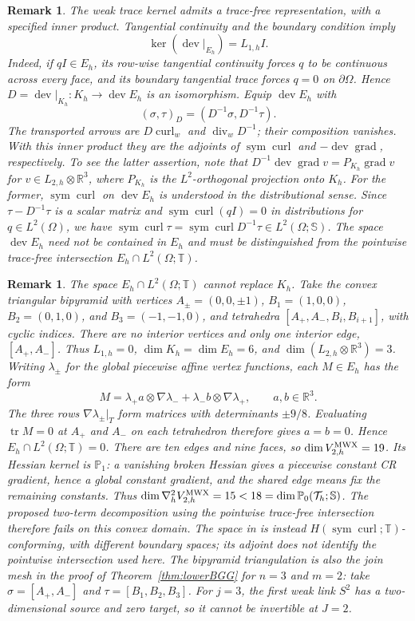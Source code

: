 \documentclass[10pt]{amsart}
\numberwithin{equation}{section}
\newtheorem{remark}[theorem]{Remark}
\newcommand{\curl}{\operatorname{curl}}
\renewcommand{\div}{\operatorname{div}}
\newcommand{\grad}{\operatorname{grad}}
\newcommand{\tr}{\operatorname{tr}}
\newcommand{\dev}{\operatorname{dev}}
\newcommand{\sym}{\operatorname{sym}}
\begin{document}
\begin{remark}\label{rem:weakTraceRepresentation}\rm
The weak trace kernel admits a trace-free representation, with a specified
inner product. Tangential continuity and the boundary condition imply
\[
\ker(\dev|_{E_h})=L_{1,h}I.
\]
Indeed, if $qI\in E_h$, its row-wise tangential continuity forces $q$ to be
continuous across every face, and its boundary tangential trace forces $q=0$
on $\partial\Omega$. Hence $D=\dev|_{K_h}:K_h\to\dev E_h$ is an isomorphism.
Equip $\dev E_h$ with
\[
(\sigma,\tau)_D=(D^{-1}\sigma,D^{-1}\tau).
\]
The transported arrows are $D\curl_w$ and $\div_wD^{-1}$; their composition
vanishes. With this inner product they are the adjoints of $\sym\curl$ and
$-\dev\grad$, respectively. To see the latter assertion, note that
$D^{-1}\dev\grad v=P_{K_h}\grad v$ for $v\in L_{2,h}\otimes\mathbb R^3$,
where $P_{K_h}$ is the $L^2$-orthogonal projection onto $K_h$.
For the former, $\sym\curl$ on $\dev E_h$ is understood in the
distributional sense. Since $\tau-D^{-1}\tau$ is a scalar matrix and
$\sym\curl(qI)=0$ in distributions for $q\in L^2(\Omega)$, we have
$\sym\curl\tau=\sym\curl D^{-1}\tau\in L^2(\Omega;\mathbb S)$.
The space $\dev E_h$ need not be contained in $E_h$ and must be
distinguished from the pointwise trace-free intersection
$E_h\cap L^2(\Omega;\mathbb T)$.
\end{remark}

\begin{remark}\label{rem:weakTraceBipyramid}\rm
The space $E_h\cap L^2(\Omega;\mathbb T)$ cannot replace $K_h$.
Take the convex triangular bipyramid with vertices
$A_\pm=(0,0,\pm1)$, $B_1=(1,0,0)$, $B_2=(0,1,0)$, and $B_3=(-1,-1,0)$,
and tetrahedra $[A_+,A_-,B_i,B_{i+1}]$, with cyclic indices.
There are no interior vertices and only one interior edge, $[A_+,A_-]$.
Thus $L_{1,h}=0$, $\dim K_h=\dim E_h=6$, and
$\dim(L_{2,h}\otimes\mathbb R^3)=3$.
Writing $\lambda_\pm$ for the global piecewise affine vertex functions, each $M\in E_h$
has the form
\[
M=\lambda_+a\otimes\nabla\lambda_-+
\lambda_-b\otimes\nabla\lambda_+,\qquad a,b\in\mathbb R^3.
\]
The three rows $\nabla\lambda_\pm|_T$ form matrices with determinants
$\pm9/8$. Evaluating $\tr M=0$ at $A_+$ and $A_-$ on each tetrahedron
therefore gives $a=b=0$. Hence $E_h\cap L^2(\Omega;\mathbb T)=0$.
There are ten edges and nine faces, so $\dim V_{2,h}^{\rm MWX}=19$.
Its Hessian kernel is $\mathbb P_1$: a vanishing broken Hessian gives a
piecewise constant CR gradient, hence a global constant gradient, and the
shared edge means fix the remaining constants. Thus
$\dim\nabla_h^2V_{2,h}^{\rm MWX}=15<18=\dim\mathbb P_0(\mathcal T_h;\mathbb S)$.
The proposed two-term decomposition using the pointwise trace-free intersection
therefore fails on this convex domain.
The space in \cite[Section 5.1.2 and Proposition 5.7]{ChenHuang2025} is instead
$H(\sym\curl;\mathbb T)$-conforming, with different boundary spaces;
its adjoint does not identify the pointwise intersection used here.
The bipyramid triangulation is also the join mesh in the proof of
Theorem~\ref{thm:lowerBGG} for $n=3$ and $m=2$: take $\sigma=[A_+,A_-]$ and
$\tau=[B_1,B_2,B_3]$. For $j=3$, the first weak link $S^2$ has a
two-dimensional source and zero target, so it cannot be invertible
at $J=2$.
\end{remark}
\end{document}
